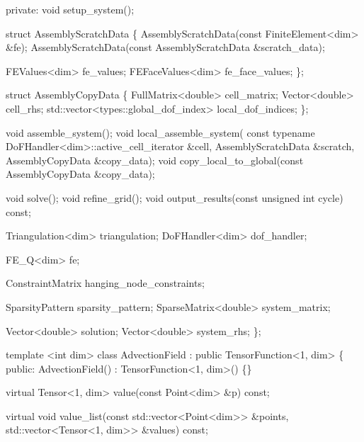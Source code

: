 \begin{DoxyCodeInclude}
\textcolor{keyword}{private}:
    \textcolor{keywordtype}{void} setup\_system();

    \textcolor{keyword}{struct }AssemblyScratchData \{
        AssemblyScratchData(\textcolor{keyword}{const} FiniteElement<dim> &fe);
        AssemblyScratchData(\textcolor{keyword}{const} AssemblyScratchData &scratch\_data);

        FEValues<dim> fe\_values;
        FEFaceValues<dim> fe\_face\_values;
    \};

    \textcolor{keyword}{struct }AssemblyCopyData \{
        FullMatrix<double> cell\_matrix;
        Vector<double> cell\_rhs;
        std::vector<types::global\_dof\_index> local\_dof\_indices;
    \};

    \textcolor{keywordtype}{void} assemble\_system();
    \textcolor{keywordtype}{void} local\_assemble\_system(
        \textcolor{keyword}{const} \textcolor{keyword}{typename} DoFHandler<dim>::active\_cell\_iterator &cell,
        AssemblyScratchData &scratch, AssemblyCopyData &copy\_data);
    \textcolor{keywordtype}{void} copy\_local\_to\_global(\textcolor{keyword}{const} AssemblyCopyData &copy\_data);


    \textcolor{keywordtype}{void} solve();
    \textcolor{keywordtype}{void} refine\_grid();
    \textcolor{keywordtype}{void} output\_results(\textcolor{keyword}{const} \textcolor{keywordtype}{unsigned} \textcolor{keywordtype}{int} cycle) \textcolor{keyword}{const};

    Triangulation<dim> triangulation;
    DoFHandler<dim> dof\_handler;

    FE\_Q<dim> fe;

    ConstraintMatrix hanging\_node\_constraints;

    SparsityPattern sparsity\_pattern;
    SparseMatrix<double> system\_matrix;

    Vector<double> solution;
    Vector<double> system\_rhs;
\};



\textcolor{keyword}{template} <\textcolor{keywordtype}{int} dim>
\textcolor{keyword}{class }AdvectionField : \textcolor{keyword}{public} TensorFunction<1, dim> \{
\textcolor{keyword}{public}:
    AdvectionField() : TensorFunction<1, dim>() \{\}

    \textcolor{keyword}{virtual} Tensor<1, dim> value(\textcolor{keyword}{const} Point<dim> &p) \textcolor{keyword}{const};

    \textcolor{keyword}{virtual} \textcolor{keywordtype}{void} value\_list(\textcolor{keyword}{const} std::vector<Point<dim>> &points,
                            std::vector<Tensor<1, dim>> &values) \textcolor{keyword}{const};


\end{DoxyCodeInclude}
